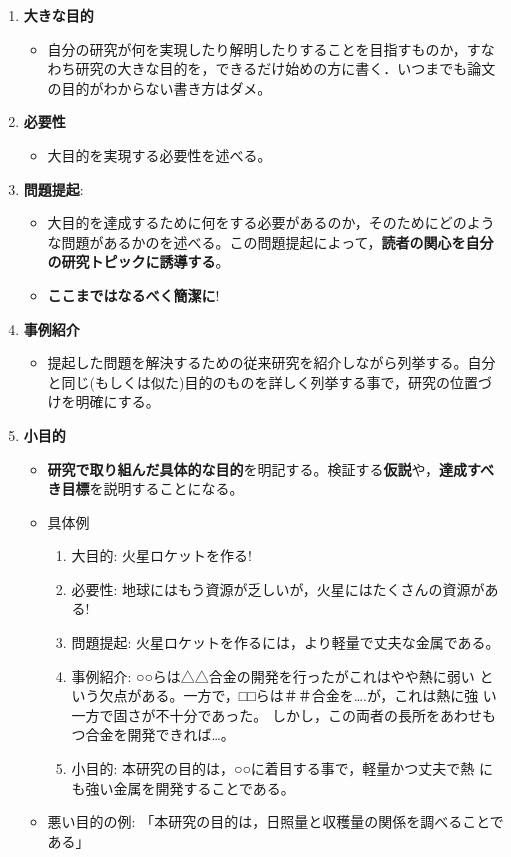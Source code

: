 \documentclass[12pt, ]{jsarticle}
\providecommand{\tightlist}{%
   \setlength{\itemsep}{0pt}\setlength{\parskip}{0pt}}
\begin{document}
\begin{enumerate}
\tightlist
\item
  \textbf{大きな目的}

  \begin{itemize}
  \tightlist
  \item
    自分の研究が何を実現したり解明したりすることを目指すものか，すなわち研究の大きな目的を，できるだけ始めの方に書く．いつまでも論文の目的がわからない書き方はダメ。
  \end{itemize}
\item
  \textbf{必要性}

  \begin{itemize}
  \tightlist
  \item
    大目的を実現する必要性を述べる。
  \end{itemize}
\item
  \textbf{問題提起}:

  \begin{itemize}
  \tightlist
  \item
    大目的を達成するために何をする必要があるのか，そのためにどのような問題があるかのを述べる。この問題提起によって，\textbf{読者の関心を自分の研究トピックに誘導する}。
  \item
    \textbf{ここまではなるべく簡潔に}!
  \end{itemize}
\item
  \textbf{事例紹介}

  \begin{itemize}
  \tightlist
  \item
    提起した問題を解決するための従来研究を紹介しながら列挙する。自分と同じ(もしくは似た)目的のものを詳しく列挙する事で，研究の位置づけを明確にする。
  \end{itemize}
\item
  \textbf{小目的}

  \begin{itemize}
  \tightlist
  \item
    \textbf{研究で取り組んだ具体的な目的}を明記する。検証する\textbf{仮説}や，\textbf{達成すべき目標}を説明することになる。
  \item
    具体例

    \begin{enumerate}
    \tightlist
    \item
      大目的: 火星ロケットを作る!
    \item
      必要性: 地球にはもう資源が乏しいが，火星にはたくさんの資源がある!
    \item
      問題提起: 火星ロケットを作るには，より軽量で丈夫な金属である。
    \item
      事例紹介: ○○らは△△合金の開発を行ったがこれはやや熱に弱い
      という欠点がある。一方で，□□らは＃＃合金を\ldots.が，これは熱に強
      い一方で固さが不十分であった。
      しかし，この両者の長所をあわせもつ合金を開発できれば\ldots。
    \item
      小目的: 本研究の目的は，○○に着目する事で，軽量かつ丈夫で熱
      にも強い金属を開発することである。
    \end{enumerate}
  \item
    悪い目的の例:
    「本研究の目的は，日照量と収穫量の関係を調べることである」


\end{itemize}
\end{enumerate}
\end{document}
